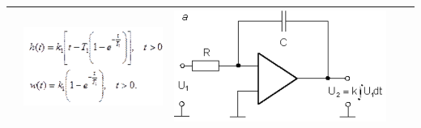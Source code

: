 \documentclass[14pt,a4paper,report]{report}
\begin{document}
\begin{table}[h!]
\begin{tabular}{ | m{3cm} | m{3.5cm} | m{4.5cm} | m{2.5cm} | m{2.5cm} }
\begin{minipage}{.3\textwidth}
		\end{minipage}
		&
		\begin{minipage}{.3\textwidth}
			\includegraphics[scale = 0.3]{images/3_4.png}
		\end{minipage}
		&
		\begin{minipage}{.3\textwidth}
			\includegraphics[scale = 0.2]{images/3_5.png}
		\end{minipage} \\ \hline
		

\end{tabular}
\end{table}
\end{document}

